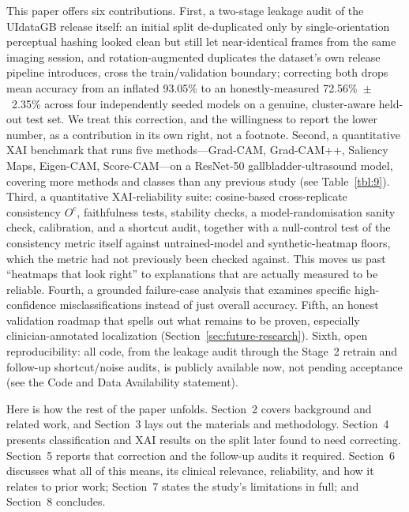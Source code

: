 This paper offers six contributions. First, a two-stage leakage audit of the UIdataGB release itself: an initial split de-duplicated only by single-orientation perceptual hashing looked clean but still let near-identical frames from the same imaging session, and rotation-augmented duplicates the dataset's own release pipeline introduces, cross the train/validation boundary; correcting both drops mean accuracy from an inflated 93.05\% to an honestly-measured 72.56\%~$\pm$~2.35\% across four independently seeded models on a genuine, cluster-aware held-out test set. We treat this correction, and the willingness to report the lower number, as a contribution in its own right, not a footnote. Second, a quantitative XAI benchmark that runs five methods---Grad-CAM, Grad-CAM++, Saliency Maps, Eigen-CAM, Score-CAM---on a ResNet-50 gallbladder-ultrasound model, covering more methods and classes than any previous study (see Table~\ref{tbl:9}). Third, a quantitative XAI-reliability suite: cosine-based cross-replicate consistency $O^c$, faithfulness tests, stability checks, a model-randomisation sanity check, calibration, and a shortcut audit, together with a null-control test of the consistency metric itself against untrained-model and synthetic-heatmap floors, which the metric had not previously been checked against. This moves us past ``heatmaps that look right'' to explanations that are actually measured to be reliable. Fourth, a grounded failure-case analysis that examines specific high-confidence misclassifications instead of just overall accuracy. Fifth, an honest validation roadmap that spells out what remains to be proven, especially clinician-annotated localization (Section~\ref{sec:future-research}). Sixth, open reproducibility: all code, from the leakage audit through the Stage~2 retrain and follow-up shortcut/noise audits, is publicly available now, not pending acceptance (see the Code and Data Availability statement).

Here is how the rest of the paper unfolds. Section~2 covers background and related work, and Section~3 lays out the materials and methodology. Section~4 presents classification and XAI results on the split later found to need correcting. Section~5 reports that correction and the follow-up audits it required. Section~6 discusses what all of this means, its clinical relevance, reliability, and how it relates to prior work; Section~7 states the study's limitations in full; and Section~8 concludes.
